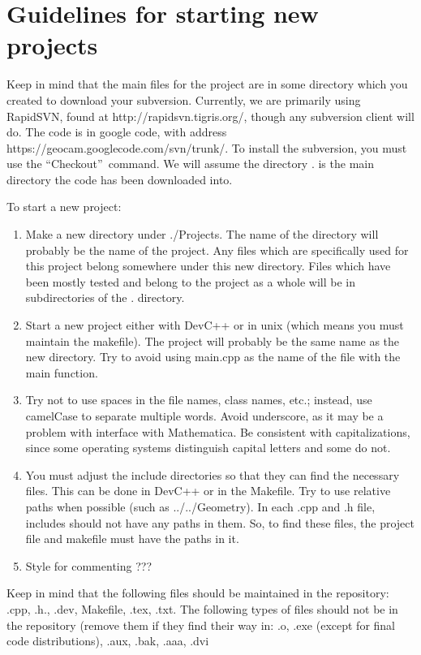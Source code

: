 \documentclass{article}%
\begin{document}
\section{Guidelines for starting new projects}

Keep in mind that the main files for the project are in some directory which
you created to download your subversion. Currently, we are primarily using
RapidSVN, found at http://rapidsvn.tigris.org/, though any subversion client
will do. The code is in google code, with address
https://geocam.googlecode.com/svn/trunk/. To install the subversion, you must
use the \textquotedblleft Checkout\textquotedblright\ command. We will assume
the directory . is the main directory the code has been downloaded into.

To start a new project:

\begin{enumerate}
\item Make a new directory under ./Projects. The name of the directory will
probably be the name of the project. Any files which are specifically used for
this project belong somewhere under this new directory. Files which have been
mostly tested and belong to the project as a whole will be in subdirectories
of the . directory.

\item Start a new project either with DevC++ or in unix (which means you must
maintain the makefile). The project will probably be the same name as the new
directory. Try to avoid using main.cpp as the name of the file with the main
function. 

\item Try not to use spaces in the file names, class names, etc.; instead, use
camelCase to separate multiple words. Avoid underscore, as it may be a problem
with interface with Mathematica. Be consistent with capitalizations, since
some operating systems distinguish capital letters and some do not.

\item You must adjust the include directories so that they can find the
necessary files. This can be done in DevC++ or in the Makefile. Try to use
relative paths when possible (such as ../../Geometry). In each .cpp and .h
file, includes should not have any paths in them. So, to find these files, the
project file and makefile must have the paths in it.

\item Style for commenting ???
\end{enumerate}

Keep in mind that the following files should be maintained in the repository:
.cpp, .h., .dev, Makefile, .tex, .txt. The following types of files should not
be in the repository (remove them if they find their way in: .o, .exe (except
for final code distributions), .aux, .bak, .aaa, .dvi
\end{document}

